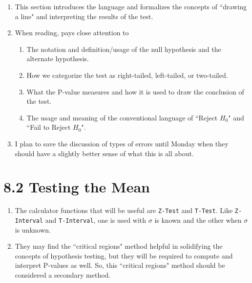 \documentclass{article}
\begin{document}
\begin{enumerate}

  \item This section introduces the language and formalizes the concepts of ``drawing a line" and interpreting the results of the test.
  
  \item When reading, pays close attention to
  
    \begin{enumerate}
    
      \item The notation and definition/usage of the null hypothesis and the alternate hypothesis. 
      
      \item How we categorize the test as right-tailed, left-tailed, or two-tailed.
      
      \item What the P-value measures and how it is used to draw the conclusion of the test.
      
      \item The usage and meaning of the conventional language of ``Reject $H_0$" and ``Fail to Reject $H_0$".
      
    \end{enumerate}
    
  \item I plan to save the discussion of types of errors until Monday when they should have a slightly better sense of what this is all about.

\end{enumerate}

\newpage

\section*{8.2 Testing the Mean}

\begin{enumerate}

  \item The calculator functions that will be useful are \texttt{Z-Test} and \texttt{T-Test}. Like \texttt{Z-Interval} and \texttt{T-Interval}, one is used with $\sigma$ is known and the other when $\sigma$ is unknown.
  
  \item They may find the ``critical regions" method helpful in solidifying the concepts of hypothesis testing, but they will be required to compute and interpret P-values as well. So, this ``critical regions" method should be considered a secondary method.
  
\end{enumerate}
\end{document}
